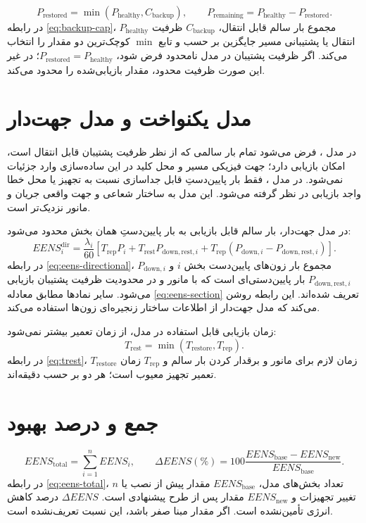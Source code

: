 \documentclass[11pt,a4paper,oneside]{book}
\begin{document}
\begin{equation}
 P_{\mathrm{restored}}=\min(P_{\mathrm{healthy}},C_{\mathrm{backup}}),
 \qquad
 P_{\mathrm{remaining}}=P_{\mathrm{healthy}}-P_{\mathrm{restored}}.
 \label{eq:backup-cap}
\end{equation}
در رابطه \eqref{eq:backup-cap}، $P_{\mathrm{healthy}}$ مجموع بار سالم قابل انتقال، $C_{\mathrm{backup}}$ ظرفیت انتقال یا پشتیبانی مسیر جایگزین بر حسب  و تابع $\min$ کوچک‌ترین دو مقدار را انتخاب می‌کند. اگر ظرفیت پشتیبان در مدل نامحدود فرض شود، $P_{\mathrm{restored}}=P_{\mathrm{healthy}}$؛ در غیر این صورت ظرفیت محدود، مقدار بازیابی‌شده را محدود می‌کند.

\section{مدل یکنواخت و مدل جهت‌دار}
در مدل \textbf{}، فرض می‌شود تمام بار سالمی که از نظر ظرفیت پشتیبان قابل انتقال است، امکان بازیابی دارد؛ جهت فیزیکی مسیر و محل کلید در این ساده‌سازی وارد جزئیات نمی‌شود. در مدل \textbf{}، فقط بار پایین‌دستِ قابل جداسازی نسبت به تجهیز یا محل خطا واجد بازیابی در نظر گرفته می‌شود. این مدل به ساختار شعاعی و جهت واقعی جریان و مانور نزدیک‌تر است.

در مدل جهت‌دار، بار سالم قابل بازیابی به بار پایین‌دستِ همان بخش محدود می‌شود:
\begin{equation}
 EENS_i^{\mathrm{dir}}=\frac{\lambda_i}{60}\left[T_{\mathrm{rep}}P_i+T_{\mathrm{rest}}P_{\mathrm{down,rest},i}+T_{\mathrm{rep}}(P_{\mathrm{down},i}-P_{\mathrm{down,rest},i})\right].
 \label{eq:eens-directional}
\end{equation}
در رابطه \eqref{eq:eens-directional}، $P_{\mathrm{down},i}$ مجموع بار زون‌های پایین‌دست بخش $i$ و $P_{\mathrm{down,rest},i}$ بار پایین‌دستی‌ای است که با مانور و در محدودیت ظرفیت پشتیبان بازیابی می‌شود. سایر نمادها مطابق معادله \eqref{eq:eens-section} تعریف شده‌اند. این رابطه روشن می‌کند که مدل جهت‌دار از اطلاعات ساختار زنجیره‌ای زون‌ها استفاده می‌کند.

زمان بازیابی قابل استفاده در مدل، از زمان تعمیر بیشتر نمی‌شود:
\begin{equation}
 T_{\mathrm{rest}}=\min(T_{\mathrm{restore}},T_{\mathrm{rep}}).
 \label{eq:trest}
\end{equation}
در رابطه \eqref{eq:trest}، $T_{\mathrm{restore}}$ زمان لازم برای مانور و برقدار کردن بار سالم و $T_{\mathrm{rep}}$ زمان تعمیر تجهیز معیوب است؛ هر دو بر حسب دقیقه‌اند.

\section{جمع  و درصد بهبود}
\begin{equation}
 EENS_{\mathrm{total}}=\sum_{i=1}^{n}EENS_i,
 \qquad
 \Delta EENS(\%)=100\frac{EENS_{\mathrm{base}}-EENS_{\mathrm{new}}}{EENS_{\mathrm{base}}}.
 \label{eq:eens-total}
\end{equation}
در رابطه \eqref{eq:eens-total}، $n$ تعداد بخش‌های مدل، $EENS_{\mathrm{base}}$ مقدار پیش از نصب یا تغییر تجهیزات و $EENS_{\mathrm{new}}$ مقدار پس از طرح پیشنهادی است. $\Delta EENS$ درصد کاهش انرژی تأمین‌نشده است. اگر مقدار مبنا صفر باشد، این نسبت تعریف‌نشده است.
\end{document}
